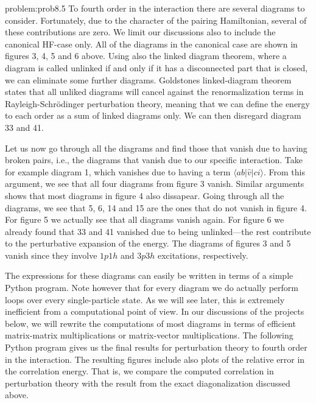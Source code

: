 \begin{sol}{problem:prob8.5}
To fourth order in the interaction there are several diagrams to consider.
Fortunately, due to the character of the pairing Hamiltonian, several of these contributions are
zero. We limit our discussions also to include the
canonical HF-case only.
All of the diagrams in the canonical case are
shown in figures 3, 4, 5 and 6 above.
Using also the linked diagram theorem, where a
diagram is called unlinked if and only if it has a disconnected part
that is closed, we can eliminate some further  diagrams. Goldstones
linked-diagram theorem states that all unliked diagrams will cancel
against the renormalization terms in Rayleigh-Schr\"odinger perturbation theory,
meaning that we can define
the energy to each order as a sum of linked diagrams
only. We can then disregard diagram 33 and 41.

Let us now go through all the diagrams and find those that vanish due
to having broken pairs, i.e., the diagrams that vanish due to our
specific interaction. Take for example diagram 1, which vanishes due
to having a term $\langle ab\vert \hat{v} \vert ci\rangle$. From this
argument, we see that all four diagrams from figure 3 vanish. Similar
arguments shows that most diagrams in figure 4 also dissapear. Going
through all the diagrams, we see that 5, 6, 14 and 15 are the ones
that do not vanish in figure 4. For figure 5 we actually see that all
diagrams vanish again. For figure 6 we already found that 33 and 41
vanished due to being unlinked---the rest contribute to the perturbative expansion of the
energy.
The diagrams of figures 3 and 5 vanish since they involve $1p1h$ and $3p3h$ excitations, respectively.

The expressions for these diagrams can easily be written in terms of a
simple Python program. Note however that for every diagram we do
actually perform loops over every single-particle state. As we will
see later, this is extremely inefficient from a computational point
of view. In our discussions of the projects below, we will rewrite the
computations of most diagrams in terms of efficient matrix-matrix
multiplications or matrix-vector multiplications.  The following
Python program gives us the final results for perturbation theory to fourth
order in the interaction. The resulting figures include also plots of the relative error in the
correlation energy. That is, we compare the computed correlation in
perturbation theory with the result from the exact diagonalization discussed above.


\end{sol}
